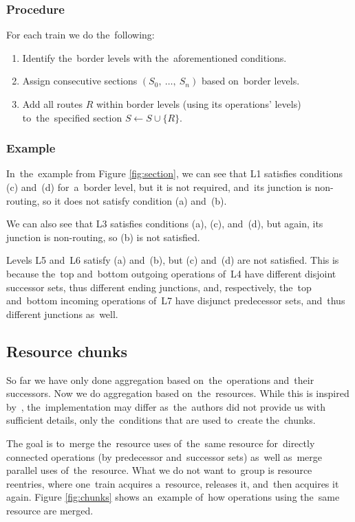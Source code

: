 \subsubsection{Procedure}

\label{sec:proc_section}
For each train we do the~following:
\begin{enumerate}
  \item Identify the~border levels with the~aforementioned conditions.
  \item Assign consecutive sections $(S_0,\ \dots,\ S_n)$ based on~border levels.
  \item Add all routes $R$ within border levels (using its operations' levels) to~the~specified section $S \gets S \cup \{R\}$.
\end{enumerate}  


\subsubsection{Example}

 In~the~example from Figure \ref{fig:section}, we can see that L1 satisfies conditions (c) and~(d) for~a~border level, but it is not required, and~its junction is non-routing, so it does not satisfy condition (a) and~(b).

We can also see that L3 satisfies conditions (a), (c), and~(d), but again, its junction is non-routing, so (b) is not satisfied.

Levels L5 and~L6 satisfy (a) and~(b), but (c) and~(d) are not satisfied. This is because the~top and~bottom outgoing operations of~L4 have different disjoint successor sets, thus different ending junctions, and, respectively, the~top and~bottom incoming operations of~L7 have disjunct predecessor sets, and~thus different junctions as~well.

\subsection{Resource chunks}
So far we have only done aggregation based on~the~operations and~their successors. Now we do aggregation based on~the~resources. While this is inspired by~\textcite{Dubach2025handling}, the~implementation may differ as~the~authors did not provide us with sufficient details, only the~conditions that are used to~create the~chunks.

The goal is to~merge the~resource uses of~the~same resource for~directly connected operations (by predecessor and~successor sets) as~well as~merge parallel uses of~the~resource. What we do not want to~group is resource reentries, where one~train acquires a~resource, releases it, and~then acquires it again. Figure \ref{fig:chunks} shows an~example of~how operations using the~same resource are merged.

